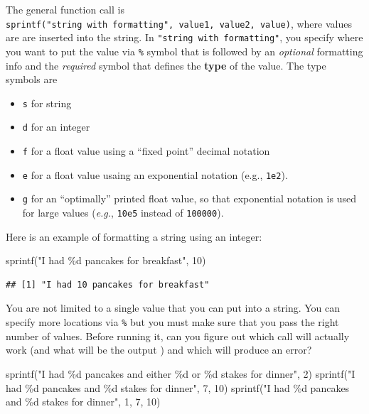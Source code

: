 \documentclass[
]{book}
\newenvironment{Shaded}{\begin{snugshade}}{\end{snugshade}}
\newcommand{\DecValTok}[1]{\textcolor[rgb]{0.00,0.00,0.81}{#1}}
\newcommand{\FunctionTok}[1]{\textcolor[rgb]{0.00,0.00,0.00}{#1}}
\newcommand{\NormalTok}[1]{#1}
\newcommand{\StringTok}[1]{\textcolor[rgb]{0.31,0.60,0.02}{#1}}
\providecommand{\tightlist}{%
  \setlength{\itemsep}{0pt}\setlength{\parskip}{0pt}}
\begin{document}
The general function call is \texttt{sprintf("string\ with\ formatting",\ value1,\ value2,\ value)}, where values are are inserted into the string. In \texttt{"string\ with\ formatting"}, you specify where you want to put the value via \texttt{\%} symbol that is followed by an \emph{optional} formatting info and the \emph{required} symbol that defines the \textbf{type} of the value. The type symbols are

\begin{itemize}
\tightlist
\item
  \texttt{s} for string
\item
  \texttt{d} for an integer
\item
  \texttt{f} for a float value using a ``fixed point'' decimal notation
\item
  \texttt{e} for a float value usaing an exponential notation (e.g., \texttt{1e2}).
\item
  \texttt{g} for an ``optimally'' printed float value, so that exponential notation is used for large values (\emph{e.g.}, \texttt{10e5} instead of \texttt{100000}).
\end{itemize}

Here is an example of formatting a string using an integer:

\begin{Shaded}
\begin{Highlighting}[]
\FunctionTok{sprintf}\NormalTok{(}\StringTok{"I had \%d pancakes for breakfast"}\NormalTok{, }\DecValTok{10}\NormalTok{)}
\end{Highlighting}
\end{Shaded}

\begin{verbatim}
## [1] "I had 10 pancakes for breakfast"
\end{verbatim}

You are not limited to a single value that you can put into a string. You can specify more locations via \texttt{\%} but you must make sure that you pass the right number of values. Before running it, can you figure out which call will actually work (and what will be the output ) and which will produce an error?

\begin{Shaded}
\begin{Highlighting}[]
\FunctionTok{sprintf}\NormalTok{(}\StringTok{"I had \%d pancakes and either \%d  or \%d stakes for dinner"}\NormalTok{, }\DecValTok{2}\NormalTok{)}
\FunctionTok{sprintf}\NormalTok{(}\StringTok{"I had \%d pancakes and \%d stakes for dinner"}\NormalTok{, }\DecValTok{7}\NormalTok{, }\DecValTok{10}\NormalTok{)}
\FunctionTok{sprintf}\NormalTok{(}\StringTok{"I had \%d pancakes and \%d stakes for dinner"}\NormalTok{, }\DecValTok{1}\NormalTok{, }\DecValTok{7}\NormalTok{, }\DecValTok{10}\NormalTok{)}
\end{Highlighting}
\end{Shaded}
\end{document}
